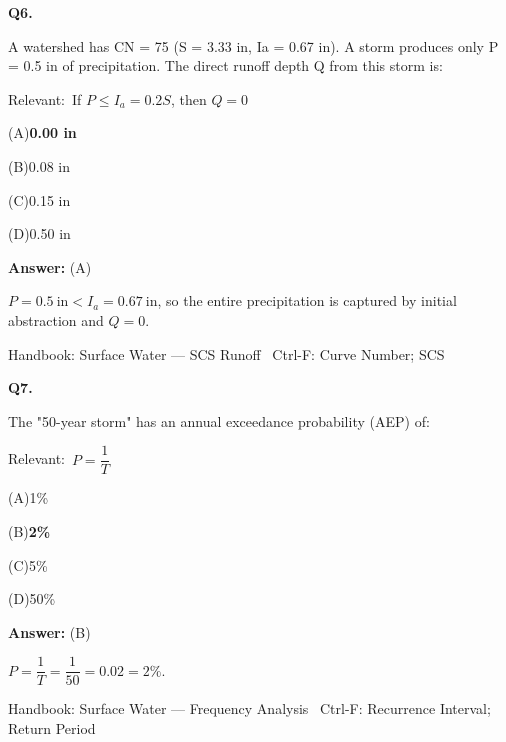 \documentclass[11pt]{article}
\newcommand{\correct}[1]{\textbf{#1}\;{\color{accent}$\checkmark$}}
\newcommand{\optline}[2]{\par\noindent\hspace{1.2em}(#1)\hspace{0.6em}#2}
\begin{document}
\vspace{9pt}
\filbreak
\textbf{\color{accent}Q6.}\par\vspace{2pt}
A watershed has CN = 75 (S = 3.33 in, Ia = 0.67 in). A storm produces only P = 0.5 in of precipitation. The direct runoff depth Q from this storm is:\par\vspace{3pt}
{\small\color{soft}Relevant:}\ If $P \le I_a = 0.2S$, then $Q = 0$\par\vspace{3pt}
\optline{A}{\correct{0.00 in}}
\optline{B}{0.08 in}
\optline{C}{0.15 in}
\optline{D}{0.50 in}
\par\vspace{3pt}
\vspace{2pt}\par\noindent\colorbox{boxbg}{\parbox{\dimexpr\linewidth-2\fboxsep\relax}{%
\vspace{2pt}\textbf{Answer:} (A)\par\vspace{2pt}
{\small $P = 0.5\ \mathrm{in} < I_a = 0.67\ \mathrm{in}$, so the entire precipitation is captured by initial abstraction and $Q = 0$.}\par\vspace{2pt}
{\footnotesize\color{soft}Handbook: Surface Water --- SCS Runoff \textbullet\ Ctrl-F: Curve Number; SCS}\vspace{2pt}
}}
\vspace{9pt}
\filbreak
\textbf{\color{accent}Q7.}\par\vspace{2pt}
The "50-year storm" has an annual exceedance probability (AEP) of:\par\vspace{3pt}
{\small\color{soft}Relevant:}\ $P = \dfrac{1}{T}$\par\vspace{3pt}
\optline{A}{1\%}
\optline{B}{\correct{2\%}}
\optline{C}{5\%}
\optline{D}{50\%}
\par\vspace{3pt}
\vspace{2pt}\par\noindent\colorbox{boxbg}{\parbox{\dimexpr\linewidth-2\fboxsep\relax}{%
\vspace{2pt}\textbf{Answer:} (B)\par\vspace{2pt}
{\small $P = \dfrac{1}{T} = \dfrac{1}{50} = 0.02 = 2\%$.}\par\vspace{2pt}
{\footnotesize\color{soft}Handbook: Surface Water --- Frequency Analysis \textbullet\ Ctrl-F: Recurrence Interval; Return Period}\vspace{2pt}
}}
\end{document}
